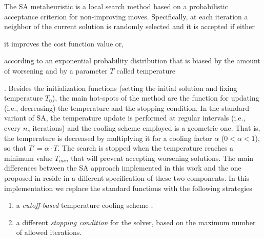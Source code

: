 \documentclass[authoryear,12pt]{article}
\begin{document}
The SA metaheuristic \citep{KiGV83} is a local search method based on a
probabilistic acceptance criterion for non-improving moves. Specifically, at
each iteration a neighbor of the current solution is randomly selected and it is
accepted if either\begin{inparaenum}\item it improves the
cost function value or, \item according to an exponential probability
distribution that is biased by the amount of worsening and by a parameter $T$
called temperature\end{inparaenum}.
%
Besides the initialization functions (setting the initial solution and fixing
temperature $T_{0}$), the main hot-spots of the method are the function for
updating (i.e., decreasing) the temperature and the stopping condition. In the
standard variant of SA, the temperature update is performed at regular intervals
(i.e., every $n_{s}$ iterations) and the cooling scheme employed is a geometric
one. That is, the temperature is decreased by multiplying it for a cooling
factor $\alpha$ ($0 < \alpha < 1$), so that $T' = \alpha \cdot T$. The search is
stopped when the temperature reaches a minimum value $T_{min}$ that will prevent
accepting worsening solutions.
%
%
The main differences between the SA approach implemented in this work and the
one proposed in \citep{BeDS12} reside in a different specification  of these two
components. In this implementation we replace the standard functions with the
following strategies

\begin{enumerate}
\item \label{search:cutoff} a \emph{cutoff-based} temperature cooling
  scheme \citep{JAMS89};
\item \label{search:stopping} a different \emph{stopping condition}
  for the solver, based on the maximum number of allowed iterations.
\end{enumerate}
\end{document}
